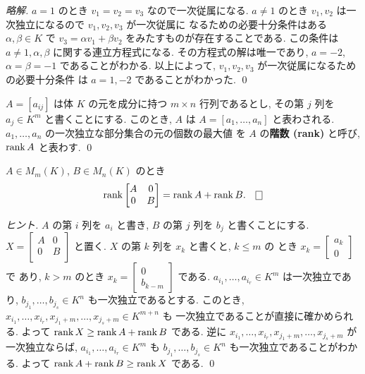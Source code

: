 \documentclass[12pt,twoside]{jarticle}
\newcommand\commentout[1]{#1}
\newcommand\commentout[1]{}
\begin{document}
\commentout{
\begin{proof}[略解]
  $a=1$ のとき $v_1=v_2=v_3$ なので一次従属になる.
  $a\ne 1$ のとき $v_1,v_2$ は一次独立になるので $v_1,v_2,v_3$ が一次従属に
  なるための必要十分条件はある $\alpha,\beta\in K$ 
  で $v_3=\alpha v_1+\beta v_2$ をみたすものが存在することである.
  この条件は $a\ne 1, \alpha,\beta$ に関する連立方程式になる.
  その方程式の解は唯一であり, $a=-2$, $\alpha=\beta=-1$ であることがわかる.
  以上によって, $v_1,v_2,v_3$ が一次従属になるための必要十分条件
  は $a=1,-2$ であることがわかった.  
  \qed
\end{proof}
}


\begin{definition}
  \label{def:rank}
  $A=[a_{ij}]$ は体 $K$ の元を成分に持つ $m\times n$ 行列であるとし,
  その第 $j$ 列を $a_j\in K^m$ と書くことにする. 
  このとき, $A$ は $A=[a_1,\ldots,a_n]$ と表わされる.
  $a_1,\ldots,a_n$ の一次独立な部分集合の元の個数の最大値
  を $A$ の{\bf 階数 (rank)} と呼び, $\mathop{\mathrm{rank}}\nolimits A$ と表わす.
  \qed
\end{definition}


\begin{question}
  \label{q:rank-A00B}
  $A\in M_m(K)$, $B\in M_n(K)$ のとき
  \begin{equation*}
    \rank
    \begin{bmatrix}
      A & 0 \\
      0 & B \\
    \end{bmatrix}
    = \rank A + \rank B.
    \qed
  \end{equation*}
\end{question}

\begin{proof}[ヒント]
  $A$ の第 $i$ 列を $a_i$ と書き, $B$ の第 $j$ 列を $b_j$ と書くことにする.
  $X=\begin{bmatrix}
    A & 0 \\
    0 & B \\
  \end{bmatrix}$ と置く. $X$ の第 $k$ 列を $x_k$ と書くと, $k\le m$ の
  とき $x_k=\begin{bmatrix} a_k \\ 0 \end{bmatrix}$ で
  あり, $k>m$ のとき $x_k=\begin{bmatrix} 0 \\ b_{k-m} \end{bmatrix}$ である.
  $a_{i_1},\ldots,a_{i_r}\in K^m$ は一次独立であり, 
  $b_{j_1},\ldots,b_{j_s}\in K^n$ も一次独立であるとする.
  このとき, $x_{i_1},\ldots,x_{i_r},x_{j_1+m},\ldots,x_{j_s+m}\in K^{m+n}$ も
  一次独立であることが直接に確かめられる.
  よって $\mathop{\mathrm{rank}}\nolimits X\ge \mathop{\mathrm{rank}}\nolimits A + \mathop{\mathrm{rank}}\nolimits B$ である.
  逆に $x_{i_1},\ldots,x_{i_r},x_{j_1+m},\ldots,x_{j_s+m}$ が一次独立ならば, 
  $a_{i_1},\ldots,a_{i_r}\in K^m$ も %
  $b_{j_1},\ldots,b_{j_s}\in K^n$ も一次独立であることがわかる.
  よって $\mathop{\mathrm{rank}}\nolimits A + \mathop{\mathrm{rank}}\nolimits B \ge \mathop{\mathrm{rank}}\nolimits X$ である.
  \qed
\end{proof}
\end{document}
